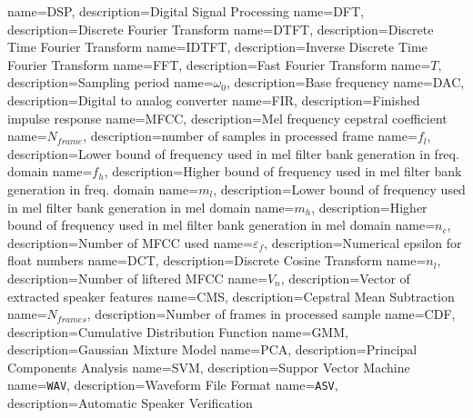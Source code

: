 	{
		name=DSP, 
		description={Digital Signal Processing}
	}
	{
		name=DFT, 
		description={Discrete Fourier Transform}
	}
	{
		name=DTFT, 
		description={Discrete Time Fourier Transform}
	}
	{
		name=IDTFT, 
		description={Inverse Discrete Time Fourier Transform}
	}
	{
		name=FFT, 
		description={Fast Fourier Transform}
	}
	{
		name=$T$, 
		description={Sampling period}
	}
	{
		name=$\omega_0$, 
		description={Base frequency}
	}
	{
		name=DAC, 
		description={Digital to analog converter}
	}
	{
		name=FIR, 
		description={Finished impulse response}
	}	
	{
		name=MFCC, 
		description={Mel frequency cepstral coefficient}
	}	
	{
		name=$N_{frame}$, 
		description={number of samples in processed frame}
	}
	{
		name=$f_l$, 
		description={Lower bound of frequency used in mel filter bank generation in freq. domain}
	}	
	{
		name=$f_h$, 
		description={Higher bound of frequency used in mel filter bank generation in freq. domain}
	}	
	{
		name=$m_l$, 
		description={Lower bound of frequency used in mel filter bank generation in mel domain}
	}	
	{
		name=$m_h$, 
		description={Higher bound of frequency used in mel filter bank generation in mel domain}
	}		
	{
		name=$n_c$, 
		description={Number of \gls{MFCC} used}
	}			
	{
		name=$\varepsilon_f$, 
		description={Numerical epsilon for float numbers}
	}	
	{
		name=DCT, 
		description={Discrete Cosine Transform}
	}
	{
		name=$n_l$, 
		description={Number of liftered \gls{MFCC}}
	}	
	{
		name=$V_n$, 
		description={Vector of extracted speaker features}
	}
	{
		name=CMS, 
		description={Cepstral Mean Subtraction}
	}
	{
		name=$N_{frames}$, 
		description={Number of frames in processed sample}
	}
	{
		name=CDF, 
		description={Cumulative Distribution Function}
	}
	{
		name=GMM, 
		description={Gaussian Mixture Model}
	}
	{
		name=PCA, 
		description={Principal Components Analysis}
	}
	{
		name=SVM, 
		description={Suppor Vector Machine}
	}
	{
		name=\texttt{WAV}, 
		description={Waveform File Format}
	}	
	{
		name=\texttt{ASV}, 
		description={Automatic Speaker Verification}
	}	


	\glsaddall
	\printglossary[style=mylong,title=Acronyms and abbreviations]